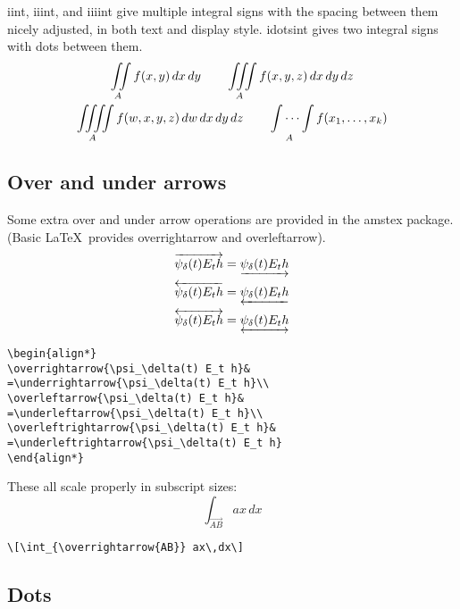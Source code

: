 \documentclass[draft]{amsart}
\newcommand{\ntt}{\normalfont\ttfamily}
\newcommand{\cn}[1]{{\protect\ntt\bslash#1}}
\newcommand{\pkg}[1]{{\protect\ntt#1}}
\theoremstyle{definition}
\theoremstyle{remark}
\begin{document}
\cn{iint}, \cn{iiint}, and \cn{iiiint} give multiple integral signs
with the spacing between them nicely adjusted,  in both text and
display style.  \cn{idotsint} gives two integral signs with dots
between them.
\begin{gather}
\iint\limits_A f(x,y)\,dx\,dy\qquad\iiint\limits_A
f(x,y,z)\,dx\,dy\,dz\\
\iiiint\limits_A
f(w,x,y,z)\,dw\,dx\,dy\,dz\qquad\idotsint\limits_A f(x_1,\dots,x_k)
\end{gather}

\subsection{Over and under arrows}

Some extra over and under arrow operations are provided in
the \pkg{amstex} package.  (Basic \LaTeX\ provides
\cn{overrightarrow} and \cn{overleftarrow}).
\begin{align*}
\overrightarrow{\psi_\delta(t) E_t h}&
=\underrightarrow{\psi_\delta(t) E_t h}\\
\overleftarrow{\psi_\delta(t) E_t h}&
=\underleftarrow{\psi_\delta(t) E_t h}\\
\overleftrightarrow{\psi_\delta(t) E_t h}&
=\underleftrightarrow{\psi_\delta(t) E_t h}
\end{align*}
\begin{verbatim}
\begin{align*}
\overrightarrow{\psi_\delta(t) E_t h}&
=\underrightarrow{\psi_\delta(t) E_t h}\\
\overleftarrow{\psi_\delta(t) E_t h}&
=\underleftarrow{\psi_\delta(t) E_t h}\\
\overleftrightarrow{\psi_\delta(t) E_t h}&
=\underleftrightarrow{\psi_\delta(t) E_t h}
\end{align*}
\end{verbatim}
These all scale properly in subscript sizes:
\[\int_{\overrightarrow{AB}} ax\,dx\]
\begin{verbatim}
\[\int_{\overrightarrow{AB}} ax\,dx\]
\end{verbatim}

\subsection{Dots}
\end{document}

